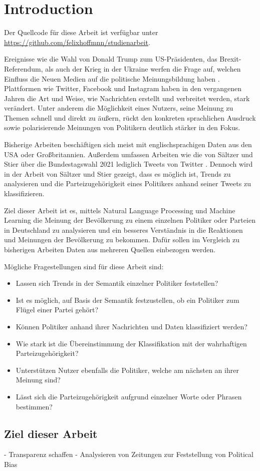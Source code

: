 
\chapter{Introduction} \label{ch:introduction}


Der Quellcode für diese Arbeit ist verfügbar unter \href{https://github.com/felixhoffmnn/studienarbeit}{https://github.com/felixhoffmnn/studienarbeit}.

Ereignisse wie die Wahl von Donald Trump zum US-Präsidenten, das Brexit-Referendum, als auch der Krieg in der Ukraine werfen die Frage auf, welchen Einfluss die Neuen Medien auf die politische Meinungsbildung haben \autocite{brandon_russia_2022, lee_how_2020}. Plattformen wie Twitter, Facebook und Instagram haben in den vergangenen Jahren die Art und Weise, wie Nachrichten erstellt und verbreitet werden, stark verändert. Unter anderem die Möglichkeit eines Nutzers, seine Meinung zu Themen schnell und direkt zu äußern, rückt den konkreten sprachlichen Ausdruck sowie polarisierende Meinungen von Politikern deutlich stärker in den Fokus.

Bisherige Arbeiten beschäftigen sich meist mit englischsprachigen Daten aus den USA oder Großbritannien. Außerdem umfassen Arbeiten wie die von Sältzer und Stier über die Bundestagswahl 2021 lediglich Tweets von Twitter \autocite{saltzer_bundestagswahl_2022}. Dennoch wird in der Arbeit von Sältzer und Stier gezeigt, dass es möglich ist, Trends zu analysieren und die Parteizugehörigkeit eines Politikers anhand seiner Tweets zu klassifizieren.

Ziel dieser Arbeit ist es, mittels Natural Language Processing und Machine Learning die Meinung der Bevölkerung zu einem einzelnen Politiker oder Parteien in Deutschland zu analysieren und ein besseres Verständnis in die Reaktionen und Meinungen der Bevölkerung zu bekommen. Dafür sollen im Vergleich zu bisherigen Arbeiten Daten aus mehreren Quellen einbezogen werden.

Mögliche Fragestellungen sind für diese Arbeit sind:

\begin{itemize}
    \item Lassen sich Trends in der Semantik einzelner Politiker feststellen?
    \item Ist es möglich, auf Basis der Semantik festzustellen, ob ein Politiker zum Flügel einer Partei gehört?
    \item Können Politiker anhand ihrer Nachrichten und Daten klassifiziert werden?
    \item Wie stark ist die Übereinstimmung der Klassifikation mit der wahrhaftigen Parteizugehörigkeit?
    \item Unterstützen Nutzer ebenfalls die Politiker, welche am nächsten an ihrer Meinung sind?
    \item Lässt sich die Parteizugehörigkeit aufgrund einzelner Worte oder Phrasen bestimmen?
\end{itemize}

\section{Ziel dieser Arbeit} \label{sec:thesisGoal}

- Transparenz schaffen
- Analysieren von Zeitungen zur Feststellung von Political Bias
